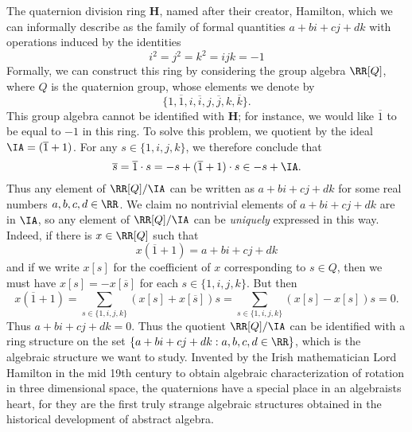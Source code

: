 \begin{example}
    The quaternion division ring $\mathbf{H}$, named after their creator, Hamilton, which we can informally describe as the family of formal quantities $a + bi + cj + dk$ with operations induced by the identities
    \[ i^2 = j^2 = k^2 = ijk = -1 \]
    Formally, we can construct this ring by considering the group algebra $\RR[Q]$, where $Q$ is the quaternion group, whose elements we denote by
    \[ \{ 1, \overline{1}, i, \overline{i}, j, \overline{j}, k, \overline{k} \}. \]
    This group algebra cannot be identified with $\mathbf{H}$; for instance, we would like $\overline{1}$ to be equal to $-1$ in this ring. To solve this problem, we quotient by the ideal $\IA = (\overline{1} + 1)$. For any $s \in \{ 1,i,j,k \}$, we therefore conclude that
    \[ \overline{s} = \overline{1} \cdot s = -s + (\overline{1} + 1) \cdot s \in -s + \IA. \]
    Thus any element of $\RR[Q]/\IA$ can be written as $a + bi + cj + dk$ for some real numbers $a,b,c,d \in \RR$. We claim no nontrivial elements of $a + bi + cj + dk$ are in $\IA$, so any element of $\RR[Q]/\IA$ can be \emph{uniquely} expressed in this way. Indeed, if there is $x \in \RR[Q]$ such that
    \[ x(\overline{1} + 1) = a + bi + cj + dk \]
    and if we write $x[s]$ for the coefficient of $x$ corresponding to $s \in Q$, then we must have $x[s] = - x[\overline{s}]$ for each $s \in \{ 1,i,j,k \}$. But then
    \[ x(\overline{1} + 1) = \sum_{s \in \{ 1,i,j,k \}} \left( x[s] + x[\overline{s}] \right) s = \sum_{s \in \{1, i,j,k \}} (x[s] - x[s]) s = 0. \]
    Thus $a + bi + cj + dk = 0$. Thus the quotient $\RR[Q]/\IA$ can be identified with a ring structure on the set $\{ a + bi + cj + dk: a,b,c,d \in \RR \}$, which is the algebraic structure we want to study. Invented by the Irish mathematician Lord Hamilton in the mid 19th century to obtain algebraic characterization of rotation in three dimensional space, the quaternions have a special place in an algebraists heart, for they are the first truly strange algebraic structures obtained in the historical development of abstract algebra.
\end{example}

